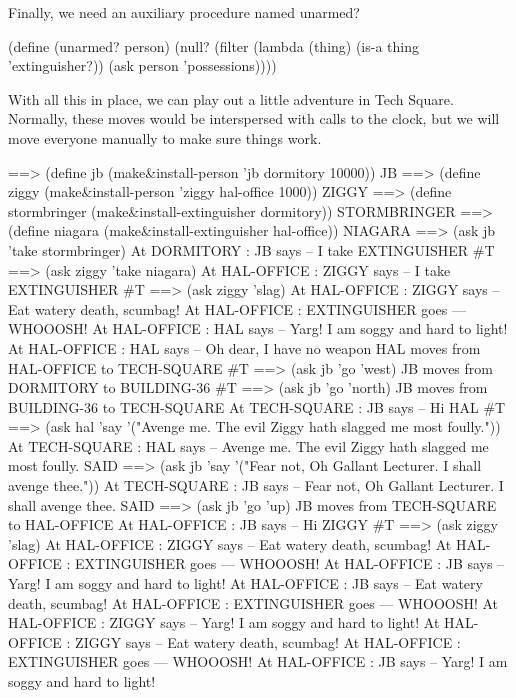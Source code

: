 Finally, we need an auxiliary procedure named {\cf unarmed?}

\beginlisp
(define (unarmed? person)
  (null? (filter (lambda (thing) (is-a thing 'extinguisher?))
                 (ask person 'possessions))))
\endlisp

With all this in place, we can play out a little adventure in Tech
Square.  Normally, these moves would be interspersed with calls to the
clock, but we will move everyone manually to make sure things work.

\beginlisp
==> (define jb    (make\&install-person 'jb    dormitory  10000))
JB
\null
==> (define ziggy (make\&install-person 'ziggy hal-office 1000))
ZIGGY
\null
==> (define stormbringer (make\&install-extinguisher dormitory))
STORMBRINGER
\null
==> (define niagara      (make\&install-extinguisher hal-office))
NIAGARA
\null
==> (ask jb 'take stormbringer)
At DORMITORY : JB says -- I take EXTINGUISHER 
\#T
\null
==> (ask ziggy 'take niagara)
At HAL-OFFICE : ZIGGY says -- I take EXTINGUISHER 
\#T
\null
==> (ask ziggy 'slag)
At HAL-OFFICE : ZIGGY says -- Eat watery death, scumbag! 
At HAL-OFFICE : EXTINGUISHER goes --- WHOOOSH! 
At HAL-OFFICE : HAL says -- Yarg!  I am soggy and hard to light! 
At HAL-OFFICE : HAL says -- Oh dear, I have no weapon 
HAL moves from HAL-OFFICE to TECH-SQUARE 
\#T
\null
==> (ask jb 'go 'west)
JB moves from DORMITORY to BUILDING-36 
\#T
\null
\endlisp
\beginlisp
==> (ask jb 'go 'north)
JB moves from BUILDING-36 to TECH-SQUARE 
At TECH-SQUARE : JB says -- Hi HAL 
\#T
\null
==> (ask hal 'say '("Avenge me.  The evil Ziggy hath slagged me most foully."))
At TECH-SQUARE : HAL says -- Avenge me. The evil Ziggy hath slagged me most foully.
SAID
\null
==> (ask jb 'say '("Fear not, Oh Gallant Lecturer.  I shall avenge thee."))
At TECH-SQUARE : JB says -- Fear not, Oh Gallant Lecturer.  I shall avenge thee. 
SAID
\null
==> (ask jb 'go 'up)
JB moves from TECH-SQUARE to HAL-OFFICE 
At HAL-OFFICE : JB says -- Hi ZIGGY 
\#T
\null
\endlisp
\beginlisp
==> (ask ziggy 'slag)
At HAL-OFFICE : ZIGGY says -- Eat watery death, scumbag! 
At HAL-OFFICE : EXTINGUISHER goes --- WHOOOSH! 
At HAL-OFFICE : JB says -- Yarg!  I am soggy and hard to light! 
At HAL-OFFICE : JB says -- Eat watery death, scumbag! 
At HAL-OFFICE : EXTINGUISHER goes --- WHOOOSH! 
At HAL-OFFICE : ZIGGY says -- Yarg!  I am soggy and hard to light! 
At HAL-OFFICE : ZIGGY says -- Eat watery death, scumbag! 
At HAL-OFFICE : EXTINGUISHER goes --- WHOOOSH! 
At HAL-OFFICE : JB says -- Yarg!  I am soggy and hard to light! 
